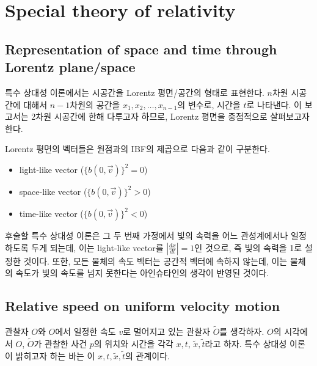 \documentclass[10pt,a4paper]{article}
\begin{document}
\newpage
\section{Special theory of relativity}
\subsection{Representation of space and time through Lorentz plane/space}
특수 상대성 이론에서는 시공간을 Lorentz 평면/공간의 형태로 표현한다. $n$차원 시공간에 대해서 $n-1$차원의 공간을 $x_1,x_2,\dots,x_{n-1}$의 변수로, 시간을 $t$로 나타낸다. 이 보고서는 2차원 시공간에 한해 다루고자 하므로, Lorentz 평면을 중점적으로 살펴보고자 한다.
\begin{tcolorbox}[title=Lorentz 평면에서의 벡터의 구분]
Lorentz 평면의 벡터들은 원점과의 IBF의 제곱으로 다음과 같이 구분한다.
    \begin{itemize}
        \item light-like vector ($\{b(0,\overrightarrow{v})\}^2=0$)
        \item space-like vector ($\{b(0,\overrightarrow{v})\}^2>0$)
        \item time-like vector ($\{b(0,\overrightarrow{v})\}^2<0$)
    \end{itemize}
\end{tcolorbox}
후술할 특수 상대성 이론은 그 두 번째 가정에서 빛의 속력을 어느 관성계에서나 일정하도록 두게 되는데, 이는 light-like vector를 $|\frac{dx}{dt}|=1$인 것으로, 즉 빛의 속력을 1로 설정한 것이다. 또한, 모든 물체의 속도 벡터는 공간적 벡터에 속하지 않는데, 이는 물체의 속도가 빛의 속도를 넘지 못한다는 아인슈타인의 생각이 반영된 것이다.

\subsection{Relative speed on uniform velocity motion}
관찰자 $O$와 $O$에서 일정한 속도 $v$로 멀어지고 있는 관찰자 $\widetilde{O}$를 생각하자.
$O$의 시각에서 $O$, $\widetilde{O}$가 관찰한 사건 $p$의 위치와 시간을 각각 $x, t$, $\tilde{x}, \tilde{t}$라고 하자.
특수 상대성 이론이 밝히고자 하는 바는 이 $x, t, \tilde{x}, \tilde{t}$의 관계이다.
\end{document}
